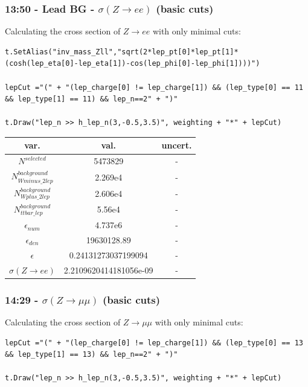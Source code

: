 \subsubsection*{13:50 - Lead BG - $\sigma(Z \rightarrow ee)$ (basic cuts)}
Calculating the cross section of $Z \rightarrow ee$ with only minimal cuts:
\begin{lstlisting}
t.SetAlias("inv_mass_Zll","sqrt(2*lep_pt[0]*lep_pt[1]*(cosh(lep_eta[0]-lep_eta[1])-cos(lep_phi[0]-lep_phi[1])))")
    
lepCut ="(" + "(lep_charge[0] != lep_charge[1]) && (lep_type[0] == 11 && lep_type[1] == 11) && lep_n==2" + ")"    
  
t.Draw("lep_n >> h_lep_n(3,-0.5,3.5)", weighting + "*" + lepCut)
\end{lstlisting}

\begin{tabular}{ | c | c | c |}
  \hline			
  var. & val. & uncert. \\
  \hline 
  
  $N^{selected}$ & 5473829 & - \\
  
  $N^{background}_{Wminus\_2lep}$ & 2.269e4 & - \\
  
  $N^{background}_{Wplus\_2lep}$ & 2.606e4 & - \\
  
  $N^{background}_{ttbar\_lep}$ & 5.56e4 & - \\
  
  $\epsilon_{num}$ & 4.737e6 & - \\
  
  $\epsilon_{den}$ & 19630128.89 & - \\
  \hline  
  $\epsilon$ &  0.24131273037199094 & - \\
  $\sigma(Z \rightarrow ee)$ &  2.2109620414181056e-09
& - \\
  \hline  
\end{tabular}

\subsubsection*{14:29 - $\sigma(Z \rightarrow \mu\mu)$ (basic cuts)}
Calculating the cross section of $Z \rightarrow \mu\mu$ with only minimal cuts:
\begin{lstlisting}
lepCut ="(" + "(lep_charge[0] != lep_charge[1]) && (lep_type[0] == 13 && lep_type[1] == 13) && lep_n==2" + ")"    
  
t.Draw("lep_n >> h_lep_n(3,-0.5,3.5)", weighting + "*" + lepCut)
\end{lstlisting}

